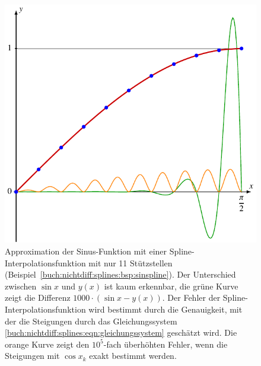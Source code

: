 %
%
%
\begin{figure}
\centering
\includegraphics{chapters/030-nichtdiff/images/sinspline.pdf}
\caption{Approximation der Sinus-Funktion mit einer
Spline-Interpolationsfunktion mit nur 11 Stützstellen
(Beispiel~\ref{buch:nichtdiff:splines:bsp:sinspline}).
Der Unterschied zwischen $\sin x$ und $y(x)$ ist kaum erkennbar,
die grüne Kurve zeigt die Differenz $1000\cdot(\sin x - y(x))$.
Der Fehler der Spline-Interpolationsfunktion wird bestimmt durch
die Genauigkeit, mit der die Steigungen durch das Gleichungssystem
\ref{buch:nichtdiff:splines:eqn:gleichungssystem} geschätzt wird.
Die orange Kurve zeigt den $10^5$-fach überhöhten Fehler, wenn die
Steigungen mit $\cos x_k$ exakt bestimmt werden.
\label{buch:nichtdiff:splines:fig:sinspline}}
\end{figure}
